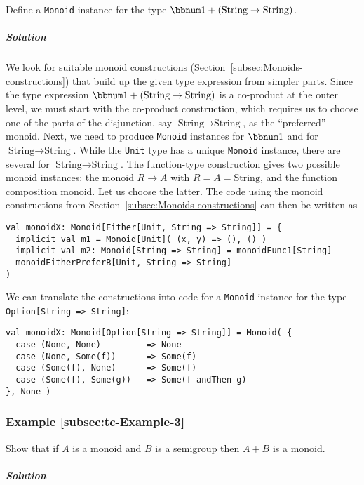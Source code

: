 Define a \lstinline!Monoid! instance for the type $\bbnum 1+(\text{String}\rightarrow\text{String})$.

\subparagraph{Solution}

We look for suitable monoid constructions (Section~\ref{subsec:Monoids-constructions})
that build up the given type expression from simpler parts. Since
the type expression $\bbnum 1+(\text{String}\rightarrow\text{String})$
is a co-product at the outer level, we must start with the co-product
construction, which requires us to choose one of the parts of the
disjunction, say $\text{String}\rightarrow\text{String}$, as the
``preferred'' monoid. Next, we need to produce \lstinline!Monoid!
instances for $\bbnum 1$ and for $\text{String}\rightarrow\text{String}$.
While the \lstinline!Unit! type has a unique \lstinline!Monoid!
instance, there are several for $\text{String}\rightarrow\text{String}$.
The function-type construction gives two possible monoid instances:
the monoid $R\rightarrow A$ with $R=A=\text{String}$, and the function
composition monoid. Let us choose the latter. The code using the monoid
constructions from Section~\ref{subsec:Monoids-constructions} can
then be written as
\begin{lstlisting}
val monoidX: Monoid[Either[Unit, String => String]] = {
  implicit val m1 = Monoid[Unit]( (x, y) => (), () )
  implicit val m2: Monoid[String => String] = monoidFunc1[String]
  monoidEitherPreferB[Unit, String => String]
)
\end{lstlisting}
We can translate the constructions into code for a \lstinline!Monoid!
instance for the type \lstinline!Option[String => String]!:
\begin{lstlisting}
val monoidX: Monoid[Option[String => String]] = Monoid( {
  case (None, None)         => None
  case (None, Some(f))      => Some(f)
  case (Some(f), None)      => Some(f)
  case (Some(f), Some(g))   => Some(f andThen g)
}, None )
\end{lstlisting}


\subsubsection{Example \label{subsec:tc-Example-3}\ref{subsec:tc-Example-3}}

Show that if $A$ is a monoid and $B$ is a semigroup then $A+B$
is a monoid.

\subparagraph{Solution}

